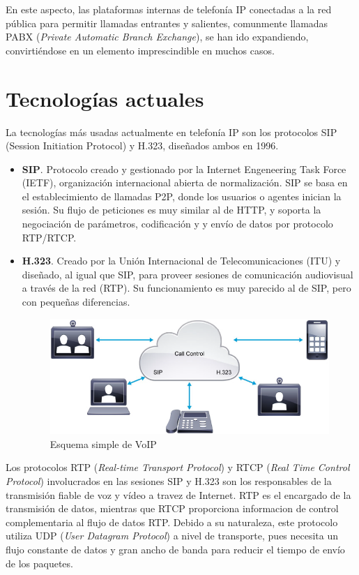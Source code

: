 \documentclass[a4paper, 12pt]{book}
\begin{document}
En este aspecto, las plataformas internas de telefonía IP conectadas a la red pública para permitir llamadas entrantes y salientes, comunmente llamadas PABX (\emph{Private Automatic Branch Exchange}), se han ido expandiendo, convirtiéndose en un elemento imprescindible en muchos casos. 

\section{Tecnologías actuales}
\label{sec:tecnologias-actuales}

La tecnologías más usadas actualmente en telefonía IP son los protocolos SIP (Session Initiation Protocol) y H.323, diseñados ambos en 1996.
\begin{itemize}
  \item  \textbf{SIP}. Protocolo creado y gestionado por la Internet Engeneering Task Force (IETF), organización internacional abierta de normalización. SIP se basa en el establecimiento de llamadas P2P, donde los usuarios o agentes inician la sesión. Su flujo de peticiones es muy similar al de HTTP, y soporta la negociación de parámetros, codificación y y envío de datos por protocolo RTP/RTCP.
  \item \textbf{H.323}. Creado por la Unión Internacional de Telecomunicaciones (ITU) y diseñado, al igual que SIP, para proveer sesiones de comunicación audiovisual a través de la red (RTP). Su funcionamiento es muy parecido al de SIP, pero con pequeñas diferencias.
  \\
  \begin{figure}[h]
    \centering
    \includegraphics{img/fig_diagrama_simple_collab}
    \caption{Esquema simple de VoIP}
    \label{figura:fig_diagrama_simple_collab}
  \end{figure}
\end{itemize}

Los protocolos RTP (\emph{Real-time Transport Protocol}) y RTCP (\emph{Real Time Control Protocol}) involucrados en las sesiones SIP y H.323 son los responsables de la transmisión fiable de voz y vídeo a travez de Internet. RTP es el encargado de la transmisión de datos, mientras que RTCP proporciona informacion de control complementaria al flujo de datos RTP. Debido a su naturaleza, este protocolo utiliza UDP (\emph{User Datagram Protocol}) a nivel de transporte, pues necesita un flujo constante de datos y gran ancho de banda para reducir el tiempo de envío de los paquetes.
\end{document}
